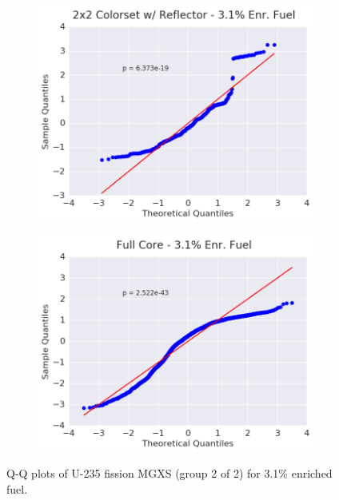 \begin{figure}[h!]
\begin{subfigure}{0.5\textwidth}
  \includegraphics[width=\linewidth]{figures/patterns/reflector/quantile/31-enr-fiss-2}  \caption{}
  \label{fig:chap9-qq-reflector-3.1-fiss}
\end{subfigure}%
\begin{subfigure}{0.5\textwidth}
  \centering
  \includegraphics[width=\linewidth]{figures/patterns/full-core/quantile/31-enr-fiss-2} \caption{}
  \label{fig:chap9-qq-full-core-3.1-fiss}
\end{subfigure}
\caption[Q-Q plots of U-235 fission MGXS for 3.1\% enriched fuel]{\ac{Q-Q} plots of U-235 fission \ac{MGXS} (group 2 of 2) for 3.1\% enriched fuel.}
\label{fig:chap9-qq-3.1-fiss}
\end{figure}

